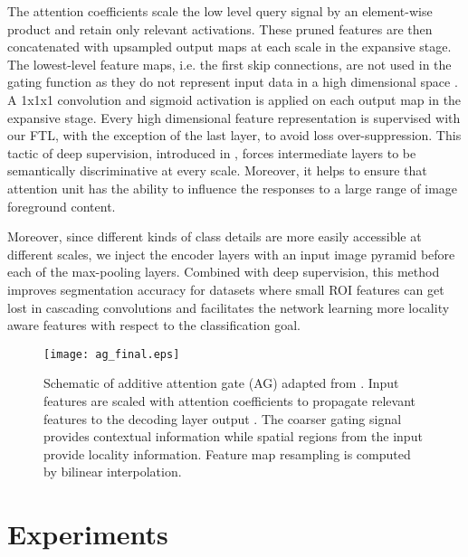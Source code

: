 \documentclass{article}
\begin{document}
 

The attention coefficients  scale the low level query signal  by an element-wise product and retain only relevant activations. These pruned features are then concatenated with upsampled output maps at each scale in the expansive stage. The lowest-level feature maps, i.e. the first skip connections, are not used in the gating function as they do not represent input data in a high dimensional space \cite{oktay}. A 1x1x1 convolution and sigmoid activation is applied on each output map in the expansive stage. Every high dimensional feature representation is supervised with our FTL, with the exception of the last layer, to avoid loss over-suppression. This tactic of deep supervision, introduced in \cite{lee}, forces intermediate layers to be semantically discriminative at every scale. Moreover, it helps to ensure that attention unit has the ability to influence the responses to a large range of image foreground content. 

Moreover, since different kinds of class details are more
easily accessible at different scales, we inject the encoder layers with an input image pyramid before each of the max-pooling layers. Combined with deep supervision, this method improves segmentation accuracy for datasets where small ROI features can get lost in cascading convolutions and facilitates the network learning more locality aware features with respect to the classification goal.

\begin{figure}
	\centering
	\centerline{\texttt{[image: ag\_final.eps]}}
\caption{ Schematic of additive attention gate (AG) adapted from 			\cite{oktay}. Input features  are scaled with attention coefficients  to propagate relevant features to the decoding layer output . The coarser gating signal  provides contextual information while spatial regions from the input  provide locality information. Feature map resampling is computed by bilinear interpolation. }\label{fig:ag}	
\end{figure}

\section{Experiments}
\label{sec:results}
\end{document}
